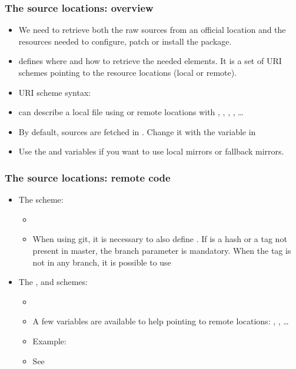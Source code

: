 \begin{frame}
  \frametitle{The source locations: overview}
  \begin{itemize}
    \item We need to retrieve both the raw sources from an official
      location and the resources needed to configure, patch or install
      the package.
    \item {} defines where and how to retrieve the
      needed elements. It is a set of URI schemes pointing to the
      resource locations (local or remote).
    \item URI scheme syntax: 
    \item {} can describe a local file using 
      or remote locations with , ,
      , , \dots
    \item By default, sources are fetched in
      . Change it with the 
      variable in 
    \item Use the  and  variables if
      you want to use local mirrors or fallback mirrors.
  \end{itemize}
\end{frame}

\begin{frame}
  \frametitle{The source locations: remote code}
  \begin{itemize}
    \item The  scheme:
      \begin{itemize}
        \item {}
        \item When using git, it is necessary to also define
          . If  is a hash or a tag not
          present in master, the branch parameter is mandatory. When
          the tag is not in any branch, it is possible to use
      \end{itemize}
    \item The ,  and  schemes:
      \begin{itemize}
        \item {}
        \item A few variables are available to help pointing to remote
          locations: ,
          , \dots
        \item Example:
        \item See 
      \end{itemize}
  \end{itemize}
\end{frame}


